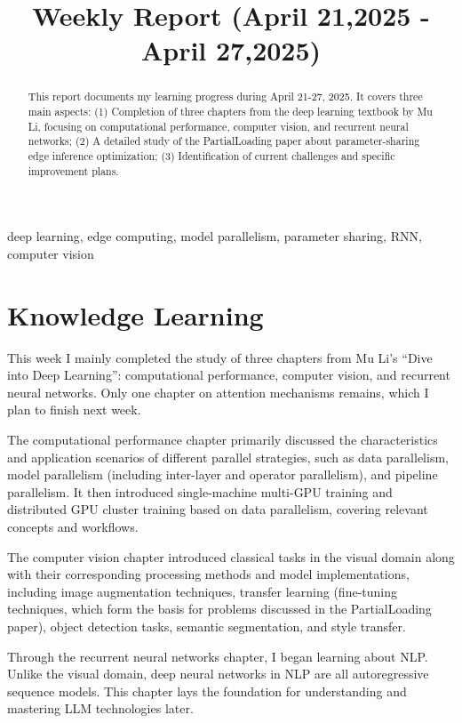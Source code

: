 \documentclass[conference]{IEEEtran}
\title{Weekly Report (April 21,2025 - April 27,2025)}
\author{\IEEEauthorblockN{1\textsuperscript{st} Xiaosong Yuan}
\IEEEauthorblockA{\textit{AISIG}\\
\textit{Shanghai Jiao Tong University}\\
Shanghai, China\\
yuanxiaosong1999@gmail.com}}
\begin{document}
\begin{CJK}{UTF8}{gbsn}
\maketitle

\begin{abstract}
This report documents my learning progress during April 21-27, 2025. It covers three main aspects: (1) Completion of three chapters from the deep learning textbook by Mu Li, focusing on computational performance, computer vision, and recurrent neural networks; (2) A detailed study of the PartialLoading paper about parameter-sharing edge inference optimization; (3) Identification of current challenges and specific improvement plans.
\end{abstract}

\begin{IEEEkeywords}
deep learning, edge computing, model parallelism, parameter sharing, RNN, computer vision
\end{IEEEkeywords}

\section{Knowledge Learning}
This week I mainly completed the study of three chapters from Mu Li's “Dive into Deep Learning”: computational performance, computer vision, and recurrent neural networks. Only one chapter on attention mechanisms remains, which I plan to finish next week.

The computational performance chapter primarily discussed the characteristics and application scenarios of different parallel strategies, such as data parallelism, model parallelism (including inter-layer and operator parallelism), and pipeline parallelism. It then introduced single-machine multi-GPU training and distributed GPU cluster training based on data parallelism, covering relevant concepts and workflows.

The computer vision chapter introduced classical tasks in the visual domain along with their corresponding processing methods and model implementations, including image augmentation techniques, transfer learning (fine-tuning techniques, which form the basis for problems discussed in the PartialLoading paper), object detection tasks, semantic segmentation, and style transfer.

Through the recurrent neural networks chapter, I began learning about NLP. Unlike the visual domain, deep neural networks in NLP are all autoregressive sequence models. This chapter lays the foundation for understanding and mastering LLM technologies later.


\end{CJK}
\end{document}
